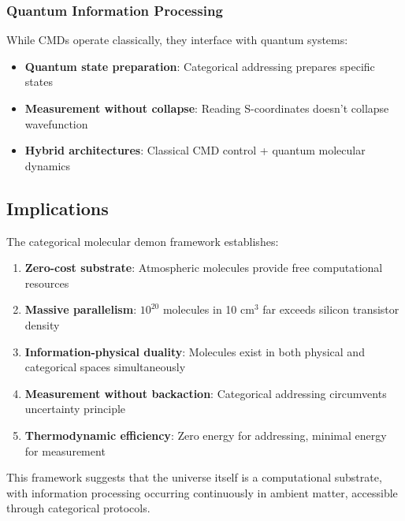 \subsubsection{Quantum Information Processing}

While CMDs operate classically, they interface with quantum systems:
\begin{itemize}
\item \textbf{Quantum state preparation}: Categorical addressing prepares specific states
\item \textbf{Measurement without collapse}: Reading S-coordinates doesn't collapse wavefunction
\item \textbf{Hybrid architectures}: Classical CMD control + quantum molecular dynamics
\end{itemize}

\subsection{Implications}

The categorical molecular demon framework establishes:

\begin{enumerate}
\item \textbf{Zero-cost substrate}: Atmospheric molecules provide free computational resources

\item \textbf{Massive parallelism}: $10^{20}$ molecules in 10 cm$^3$ far exceeds silicon transistor density

\item \textbf{Information-physical duality}: Molecules exist in both physical and categorical spaces simultaneously

\item \textbf{Measurement without backaction}: Categorical addressing circumvents uncertainty principle

\item \textbf{Thermodynamic efficiency}: Zero energy for addressing, minimal energy for measurement
\end{enumerate}

This framework suggests that the universe itself is a computational substrate, with information processing occurring continuously in ambient matter, accessible through categorical protocols.
